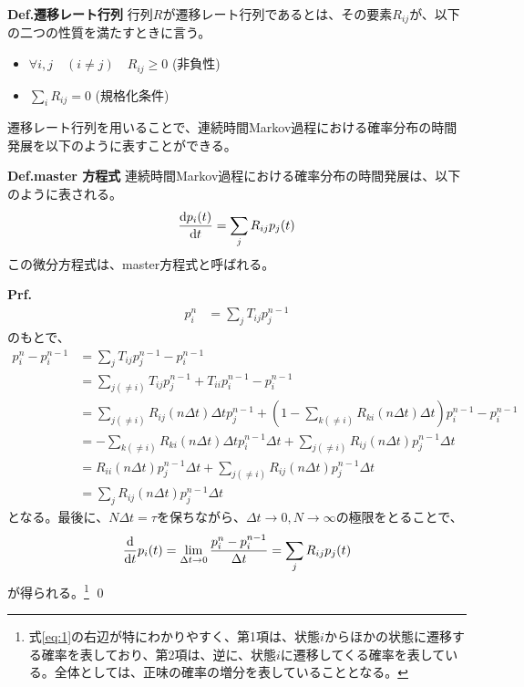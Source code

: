 \documentclass[a4paper,11pt]{jsarticle}
\numberwithin{equation}{section}
\begin{document}
\begin{itembox}[l]{\textbf{Def.遷移レート行列}}
    行列$R$が遷移レート行列であるとは、その要素$R_{ij}$が、以下の二つの性質を満たすときに言う。
    \begin{itemize}
        \item $\forall i,j \quad (i \neq j) \quad R_{ij} \geq 0$ (非負性)
        \item $\sum_{i} R_{ij} = 0$ (規格化条件)
    \end{itemize}
\end{itembox}

遷移レート行列を用いることで、連続時間Markov過程における確率分布の時間発展を以下のように表すことができる。

\begin{itembox}[l]{\textbf{Def.master 方程式}}
    連続時間Markov過程における確率分布の時間発展は、以下のように表される。
    \begin{align}
        \dv{p_i(t)}{t} = \sum_{j} R_{ij} p_j(t)
    \end{align}
    この微分方程式は、master方程式と呼ばれる。
\end{itembox}
\textbf{Prf.}\\
\begin{align}
    p_i^{n} &= \sum_{j}T_{ij}p_j^{n-1}
  \end{align}
  のもとで、
  \begin{align}
    p_i^n - p_i^{n-1} &= \sum_{j}T_{ij}p_j^{n-1} - p_i^{n-1}\\
    &= \sum_{j(\neq i)}T_{ij}p_j^{n-1} + T_{ii}p_i^{n-1} - p_i^{n-1}\\
    &= \sum_{j(\neq i)}R_{ij} (n\Delta t)\Delta t p_j^{n-1} + (1-\sum_{k(\neq i)}R_{ki} (n\Delta t)\Delta t)p_i^{n-1} - p_i^{n-1}\\
    &= -\sum_{k(\neq i)}R_{ki} (n\Delta t)\Delta t p_i^{n-1} \Delta t + \sum_{j(\neq i)}R_{ij} (n\Delta t)p_j^{n-1}\Delta t\label{eq:1}\\
    &= R_{ii} (n\Delta t)p_j^{n-1}\Delta t + \sum_{j(\neq i)}R_{ij} (n\Delta t)p_j^{n-1}\Delta t\\
    &= \sum_{j}R_{ij} (n\Delta t)p_j^{n-1}\Delta t
  \end{align}
  となる。最後に、$N \Delta t = \tau$を保ちながら、$\Delta t \to 0, N \to \infty$の極限をとることで、
  \begin{align}
    \dv{t}p_i(t) = \lim_{\Delta t \to 0}\frac{p_i^n - p_i^{n-1}}{\Delta t} = \sum_{j}R_{ij}p_j(t)
  \end{align}
  が得られる。\footnote{式\eqref{eq:1}の右辺が特にわかりやすく、第1項は、状態$i$からほかの状態に遷移する確率を表しており、第2項は、逆に、状態$i$に遷移してくる確率を表している。全体としては、正味の確率の増分を表していることとなる。}
  \qed\\
\end{document}
